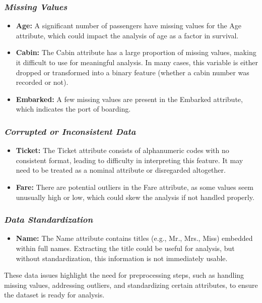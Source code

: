 \documentclass[twoside,11pt]{article}
\makeatletter
\let\@oldsubsubsection\subsubsection
\renewcommand\subsubsection[1]{\@oldsubsubsection*{\textit{#1}}}
\makeatother
\begin{document}
\subsubsection{Missing Values}
\begin{itemize}
    \item \textbf{Age:} A significant number of passengers have missing values for the Age attribute, which could impact the analysis of age as a factor in survival.
    \item \textbf{Cabin:} The Cabin attribute has a large proportion of missing values, making it difficult to use for meaningful analysis. In many cases, this variable is either dropped or transformed into a binary feature (whether a cabin number was recorded or not).
    \item \textbf{Embarked:} A few missing values are present in the Embarked attribute, which indicates the port of boarding.
\end{itemize}

\subsubsection{Corrupted or Inconsistent Data}
\begin{itemize}
    \item \textbf{Ticket:} The Ticket attribute consists of alphanumeric codes with no consistent format, leading to difficulty in interpreting this feature. It may need to be treated as a nominal attribute or disregarded altogether.
    \item \textbf{Fare:} There are potential outliers in the Fare attribute, as some values seem unusually high or low, which could skew the analysis if not handled properly.
\end{itemize}

\subsubsection{Data Standardization}
\begin{itemize}
    \item \textbf{Name:} The Name attribute contains titles (e.g., Mr., Mrs., Miss) embedded within full names. Extracting the title could be useful for analysis, but without standardization, this information is not immediately usable.
\end{itemize}

These data issues highlight the need for preprocessing steps, such as handling missing values, addressing outliers, and standardizing certain attributes, to ensure the dataset is ready for analysis.
\end{document}

